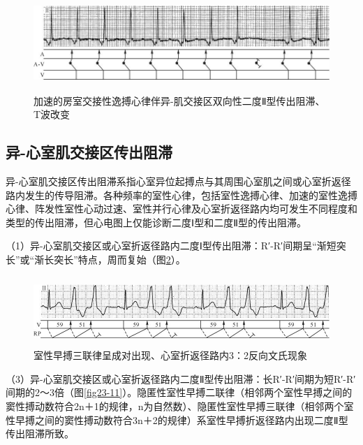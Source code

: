 \begin{figure}[!htbp]
 \centering
 \includegraphics[width=5.78125in,height=1.4375in]{./images/Image00393.jpg}
 \captionsetup{justification=centering}
 \caption{加速的房室交接性逸搏心律伴异-肌交接区双向性二度Ⅱ型传出阻滞、T波改变}
 \label{fig23-9}
  \end{figure} 

\protect\hypertarget{text00030.htmlux5cux23subid363}{}{}

\subsection{异-心室肌交接区传出阻滞}

异-心室肌交接区传出阻滞系指心室异位起搏点与其周围心室肌之间或心室折返径路内发生的传导阻滞。各种频率的室性心律，包括室性逸搏心律、加速的室性逸搏心律、阵发性室性心动过速、室性并行心律及心室折返径路内均可发生不同程度和类型的传出阻滞，但心电图上仅能诊断二度Ⅰ型和二度Ⅱ型的传出阻滞。

（1）异-心室肌交接区或心室折返径路内二度Ⅰ型传出阻滞：R′-R′间期呈“渐短突长”或“渐长突长”特点，周而复始（图\ref{fig23-10}）。

\begin{figure}[!htbp]
 \centering
 \includegraphics[width=5.72917in,height=1.03125in]{./images/Image00394.jpg}
 \captionsetup{justification=centering}
 \caption{室性早搏三联律呈成对出现、心室折返径路内3：2反向文氏现象}
 \label{fig23-10}
  \end{figure} 

（3）异-心室肌交接区或心室折返径路内二度Ⅱ型传出阻滞：长R′-R′间期为短R′-R′间期的2～3倍（图\ref{fig23-11}）。隐匿性室性早搏二联律（相邻两个室性早搏之间的窦性搏动数符合2n＋1的规律，n为自然数）、隐匿性室性早搏三联律（相邻两个室性早搏之间的窦性搏动数符合3n＋2的规律）系室性早搏折返径路内出现二度Ⅱ型传出阻滞所致。

